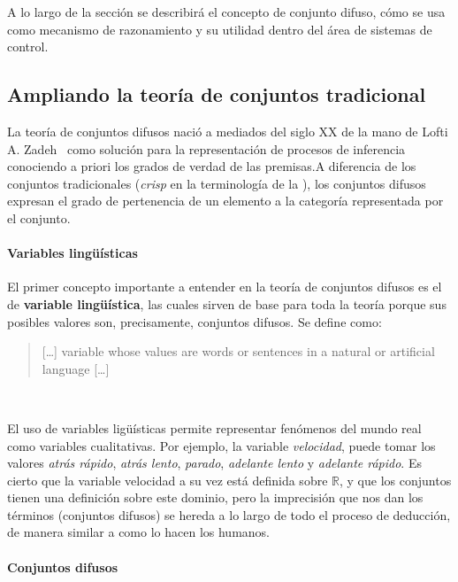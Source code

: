 A lo largo de la sección se describirá el concepto de conjunto difuso, cómo se usa como mecanismo de razonamiento y su utilidad dentro del área de sistemas de control.

\subsection{Ampliando la teoría de conjuntos tradicional}

La teoría de conjuntos difusos nació a mediados del siglo XX de la mano de Lofti A. Zadeh~\cite{lofti1965fuzzy} como solución para la representación de procesos de inferencia conociendo a priori los grados de verdad de las premisas.A diferencia de los conjuntos tradicionales (\textit{crisp} en la terminología de la ), los conjuntos difusos expresan el grado de pertenencia de un elemento a la categoría representada por el conjunto.

\paragraph{Variables lingüísticas}

El primer concepto importante a entender en la teoría de conjuntos difusos es el de \textbf{variable lingüística}, las cuales sirven de base para toda la teoría porque sus posibles valores son, precisamente, conjuntos difusos. Se define como:

\blockquote{[\ldots] variable whose values are words or sentences in a natural or artificial language [\ldots]}~\cite{zadeh1975concept}

El uso de variables ligüísticas permite representar fenómenos del mundo real como variables cualitativas. Por ejemplo, la variable \textit{velocidad}, puede tomar los valores \textit{atrás rápido}, \textit{atrás lento}, \textit{parado}, \textit{adelante lento} y \textit{adelante rápido}. Es cierto que la variable velocidad a su vez está definida sobre $\mathbb{R}$, y que los conjuntos tienen una definición sobre este dominio, pero la imprecisión que nos dan los términos (conjuntos difusos) se hereda a lo largo de todo el proceso de deducción, de manera similar a como lo hacen los humanos.

\paragraph{Conjuntos difusos}

